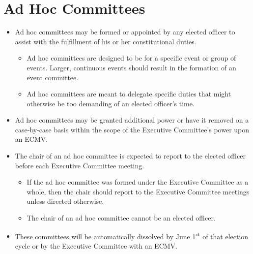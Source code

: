 \documentclass[12pt]{constitution}
\newcommand{\datetermstart}{June 1\textsuperscript{st}} %
\begin{document}
\section{Ad Hoc Committees}
\label{sec:exec_adhoc}
\begin{itemize}
    \item Ad hoc committees may be formed or appointed by any elected officer to assist with the fulfillment of his or her constitutional duties.
    \begin{itemize}
        \item Ad hoc committees are designed to be for a specific event or group of events. Larger, continuous events should result in the formation of an event committee.
        \item Ad hoc committees are meant to delegate specific duties that might otherwise be too demanding of an elected officer's time.
    \end{itemize}
    \item Ad hoc committees may be granted additional power or have it removed on a case-by-case basis within the scope of the Executive Committee's power upon an ECMV.
    \item The chair of an ad hoc committee is expected to report to the elected officer before each Executive Committee meeting.
    \begin{itemize}
        \item If the ad hoc committee was formed under the Executive Committee as a whole, then the chair should report to the Executive Committee meetings unless directed otherwise.
	\item The chair of an ad hoc committee cannot be an elected officer.
    \end{itemize}
    \item These committees will be automatically dissolved by \datetermstart{} of that election cycle or by the Executive Committee with an ECMV.
\end{itemize}
\end{document}
